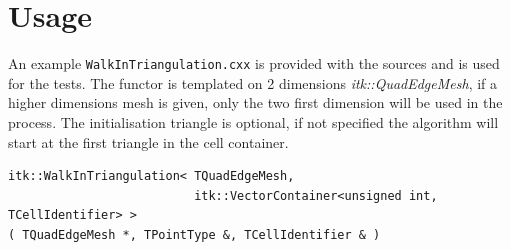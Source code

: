 \documentclass{InsightArticle}
\begin{document}
\section{Usage}

An example \texttt{WalkInTriangulation.cxx} is provided with the sources and is used for the tests. The functor is templated on 2 dimensions \textit{itk::QuadEdgeMesh}, if a higher dimensions mesh is given, only the two first dimension will be used in the process. The initialisation triangle is optional, if not specified the algorithm will start at the first triangle in the cell container.
\begin{verbatim}
itk::WalkInTriangulation< TQuadEdgeMesh, 
                          itk::VectorContainer<unsigned int, TCellIdentifier> >
( TQuadEdgeMesh *, TPointType &, TCellIdentifier & )
\end{verbatim}


%
%



\end{document}
